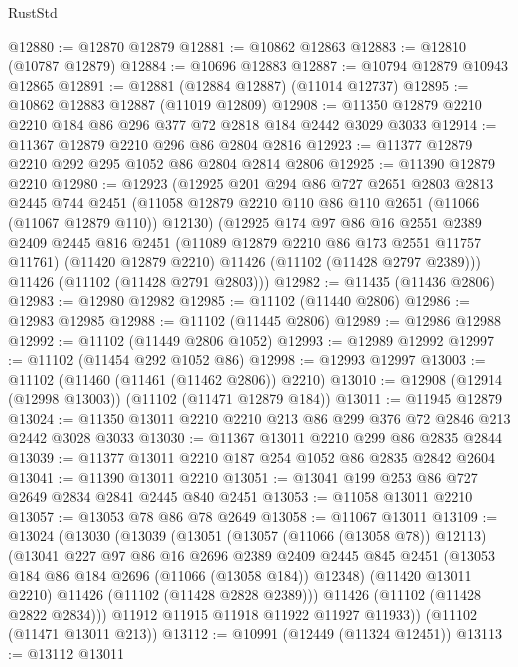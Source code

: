 \begin{lexlean}{RustStd}
\begin{coremodule}
@12880 := @12870 @12879
@12881 := @10862 @12863
@12883 := @12810 (@10787 @12879)
@12884 := @10696 @12883
@12887 := @10794 @12879 @10943 @12865
@12891 := @12881 (@12884 @12887) (@11014 @12737)
@12895 := @10862 @12883 @12887 (@11019 @12809)
@12908 := @11350 @12879 @2210 @2210 @184 @86 @296 @377 @72 @2818 @184 @2442 @3029 @3033
@12914 := @11367 @12879 @2210 @296 @86 @2804 @2816
@12923 := @11377 @12879 @2210 @292 @295 @1052 @86 @2804 @2814 @2806
@12925 := @11390 @12879 @2210
@12980 := @12923
    (@12925
      @201
      @294
      @86
      @727
      @2651
      @2803
      @2813
      @2445
      @744
      @2451
      (@11058 @12879 @2210 @110 @86 @110 @2651 (@11066 (@11067 @12879 @110)) @12130)
      (@12925
        @174
        @97
        @86
        @16
        @2551
        @2389
        @2409
        @2445
        @816
        @2451
        (@11089 @12879 @2210 @86 @173 @2551 @11757 @11761)
        (@11420 @12879 @2210)
        @11426
        (@11102 (@11428 @2797 @2389)))
      @11426
      (@11102 (@11428 @2791 @2803)))
@12982 := @11435 (@11436 @2806)
@12983 := @12980 @12982
@12985 := @11102 (@11440 @2806)
@12986 := @12983 @12985
@12988 := @11102 (@11445 @2806)
@12989 := @12986 @12988
@12992 := @11102 (@11449 @2806 @1052)
@12993 := @12989 @12992
@12997 := @11102 (@11454 @292 @1052 @86)
@12998 := @12993 @12997
@13003 := @11102 (@11460 (@11461 (@11462 @2806)) @2210)
@13010 := @12908 (@12914 (@12998 @13003)) (@11102 (@11471 @12879 @184))
@13011 := @11945 @12879
@13024 := @11350 @13011 @2210 @2210 @213 @86 @299 @376 @72 @2846 @213 @2442 @3028 @3033
@13030 := @11367 @13011 @2210 @299 @86 @2835 @2844
@13039 := @11377 @13011 @2210 @187 @254 @1052 @86 @2835 @2842 @2604
@13041 := @11390 @13011 @2210
@13051 := @13041 @199 @253 @86 @727 @2649 @2834 @2841 @2445 @840 @2451
@13053 := @11058 @13011 @2210
@13057 := @13053 @78 @86 @78 @2649
@13058 := @11067 @13011
@13109 := @13024
    (@13030
      (@13039
        (@13051
          (@13057 (@11066 (@13058 @78)) @12113)
          (@13041
            @227
            @97
            @86
            @16
            @2696
            @2389
            @2409
            @2445
            @845
            @2451
            (@13053 @184 @86 @184 @2696 (@11066 (@13058 @184)) @12348)
            (@11420 @13011 @2210)
            @11426
            (@11102 (@11428 @2828 @2389)))
          @11426
          (@11102 (@11428 @2822 @2834)))
        @11912
        @11915
        @11918
        @11922
        @11927
        @11933))
    (@11102 (@11471 @13011 @213))
@13112 := @10991 (@12449 (@11324 @12451))
@13113 := @13112 @13011

\end{coremodule}
\end{lexlean}
